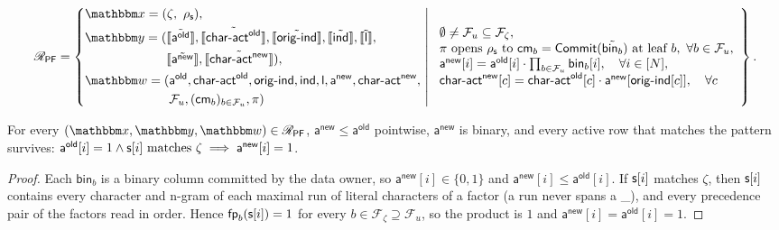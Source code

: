 \else
\begin{equation*}
\NPRelation_{\mathsf{PF}} = \left\{
\begin{aligned}
  & \NPInstance = (\zeta,\ \rho_\strcol),\\
  & \NPInstancey = (\Oracle{\MLE{\mathsf{a}^{\mathsf{old}}}}, \Oracle{\MLE{\mathsf{char\text{-}act}^{\mathsf{old}}}}, \Oracle{\MLE{\mathsf{orig\text{-}ind}}}, \Oracle{\MLE{\mathsf{ind}}}, \Oracle{\MLE{\mathsf{l}}},\\
  & \phantom{\NPInstancey = (} \Oracle{\MLE{\mathsf{a}^{\mathsf{new}}}}, \Oracle{\MLE{\mathsf{char\text{-}act}^{\mathsf{new}}}}),\\
  & \NPWitness = (\mathsf{a}^{\mathsf{old}}, \mathsf{char\text{-}act}^{\mathsf{old}}, \mathsf{orig\text{-}ind}, \mathsf{ind}, \mathsf{l}, \mathsf{a}^{\mathsf{new}}, \mathsf{char\text{-}act}^{\mathsf{new}},\\
  & \phantom{\NPWitness = (} \mathcal{F}_u, (\Commitment_b)_{b\in\mathcal{F}_u}, \pi)
\end{aligned}
\ \middle|\
\begin{array}{l}
\emptyset \neq \mathcal{F}_u \subseteq \mathcal{F}_\zeta,\\
\pi \text{ opens } \rho_\strcol \text{ to } \Commitment_b = \Commit(\MLE{\mathsf{bin}_b}) \text{ at leaf } b,\ \forall b\in\mathcal{F}_u,\\
\mathsf{a}^{\mathsf{new}}[i] = \mathsf{a}^{\mathsf{old}}[i]\cdot\prod_{b\in\mathcal{F}_u}\mathsf{bin}_b[i],\quad \forall i\in[N],\\
\mathsf{char\text{-}act}^{\mathsf{new}}[c] = \mathsf{char\text{-}act}^{\mathsf{old}}[c]\cdot\mathsf{a}^{\mathsf{new}}[\mathsf{orig\text{-}ind}[c]],\quad \forall c
\end{array}
\right\}.
\end{equation*}
\fi

\begin{ilemma}\label{lem:prefilter-sound}
For every $(\NPInstance, \NPInstancey, \NPWitness)\in\NPRelation_{\mathsf{PF}}$, $\mathsf{a}^{\mathsf{new}}\le\mathsf{a}^{\mathsf{old}}$ pointwise, $\mathsf{a}^{\mathsf{new}}$ is binary, and every active row that matches the pattern survives:
$\mathsf{a}^{\mathsf{old}}[i]=1 \wedge \strcol[i]\ \text{matches}\ \zeta \implies \mathsf{a}^{\mathsf{new}}[i]=1$.
\end{ilemma}
\begin{proof}
Each $\mathsf{bin}_b$ is a binary column committed by the data owner, so $\mathsf{a}^{\mathsf{new}}[i]\in\{0,1\}$ and $\mathsf{a}^{\mathsf{new}}[i]\le\mathsf{a}^{\mathsf{old}}[i]$. If $\mathsf{s}[i]$ matches $\zeta$, then $\mathsf{s}[i]$ contains every character and n-gram of each maximal run of literal characters of a factor (a run never spans a \_), and every precedence pair of the factors read in order. Hence $\mathsf{fp}_b(\mathsf{s}[i])=1$ for every $b\in\mathcal{F}_\zeta\supseteq\mathcal{F}_u$, so the product is $1$ and $\mathsf{a}^{\mathsf{new}}[i]=\mathsf{a}^{\mathsf{old}}[i]=1$.
\end{proof}
